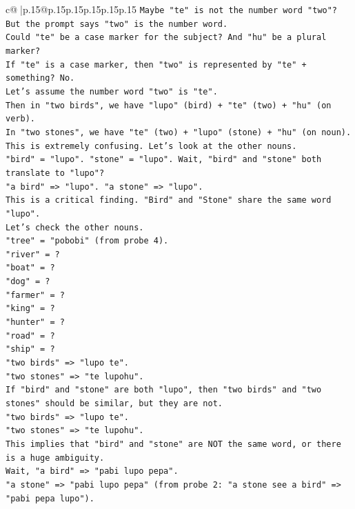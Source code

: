 \documentclass{article}
\begin{document}
{\begin{supertabular}{c@{$\;$}|p{.15\linewidth}@{}p{.15\linewidth}p{.15\linewidth}p{.15\linewidth}p{.15\linewidth}p{.15\linewidth}}
{{{\texttt{Maybe "te" is not the number word "two"? But the prompt says "two" is the number word.} \\
\texttt{Could "te" be a case marker for the subject? And "hu" be a plural marker?} \\
\texttt{If "te" is a case marker, then "two" is represented by "te" + something? No.} \\
\texttt{Let's assume the number word "two" is "te".} \\
\texttt{Then in "two birds", we have "lupo" (bird) + "te" (two) + "hu" (on verb).} \\
\texttt{In "two stones", we have "te" (two) + "lupo" (stone) + "hu" (on noun).} \\
\texttt{This is extremely confusing. Let's look at the other nouns.} \\
\texttt{"bird" = "lupo". "stone" = "lupo". Wait, "bird" and "stone" both translate to "lupo"?} \\
\texttt{"a bird" => "lupo". "a stone" => "lupo".} \\
\texttt{This is a critical finding. "Bird" and "Stone" share the same word "lupo".} \\
\texttt{Let's check the other nouns.} \\
\texttt{"tree" = "pobobi" (from probe 4).} \\
\texttt{"river" = ?} \\
\texttt{"boat" = ?} \\
\texttt{"dog" = ?} \\
\texttt{"farmer" = ?} \\
\texttt{"king" = ?} \\
\texttt{"hunter" = ?} \\
\texttt{"road" = ?} \\
\texttt{"ship" = ?} \\
\texttt{"two birds" => "lupo te".} \\
\texttt{"two stones" => "te lupohu".} \\
\texttt{If "bird" and "stone" are both "lupo", then "two birds" and "two stones" should be similar, but they are not.} \\
\texttt{"two birds" => "lupo te".} \\
\texttt{"two stones" => "te lupohu".} \\
\texttt{This implies that "bird" and "stone" are NOT the same word, or there is a huge ambiguity.} \\
\texttt{Wait, "a bird" => "pabi lupo pepa".} \\
\texttt{"a stone" => "pabi lupo pepa" (from probe 2: "a stone see a bird" => "pabi pepa lupo").} \\
}}}
\end{supertabular}}
\end{document}
